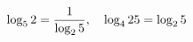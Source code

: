 \documentclass[preview]{standalone}
\begin{document}
\begin{align*}
\special{dvisvgm:raw <g id='unique000'>}\log_{5}2=\frac{1}{\log_{2}5},\quad \log_{4}25=\log_{2}5\special{dvisvgm:raw </g>}
\end{align*}
\end{document}
